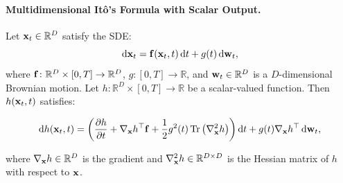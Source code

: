 \paragraph{Multidimensional It\^o's Formula with Scalar Output.}
Let ${\mathbf{x}}_t \in \mathbb{R}^D$ satisfy the SDE:
\[
\mathop{}\!\mathrm{d} {\mathbf{x}}_t = {\mathbf{f}}({\mathbf{x}}_t, t) \mathop{}\!\mathrm{d} t + g(t) \mathop{}\!\mathrm{d} {\mathbf{w}}_t,
\]
where ${\mathbf{f}} \colon \mathbb{R}^D \times [0, T] \to \mathbb{R}^D$, $g \colon [0, T] \to \mathbb{R}$, and ${\mathbf{w}}_t \in \mathbb{R}^D$ is a $D$-dimensional Brownian motion. Let $h \colon \mathbb{R}^D \times [0, T] \to \mathbb{R}$ be a scalar-valued function. Then $h({\mathbf{x}}_t, t)$ satisfies:
\begin{mdframed}
\begin{align}\label{eq:Ito-scalar}
    \mathop{}\!\mathrm{d} h({\mathbf{x}}_t, t)
= \left( \frac{\partial h}{\partial t}
+ \nabla_{{\mathbf{x}}} h^\top {\mathbf{f}}
+ \frac{1}{2} g^2(t) \operatorname{Tr} \left( \nabla^2_{{\mathbf{x}}} h \right) \right) \mathop{}\!\mathrm{d} t
+ g(t) \nabla_{{\mathbf{x}}} h^\top \mathop{}\!\mathrm{d} {\mathbf{w}}_t,
\end{align}
\end{mdframed}
where $\nabla_{{\mathbf{x}}} h \in \mathbb{R}^D$ is the gradient and $\nabla^2_{{\mathbf{x}}} h \in \mathbb{R}^{D \times D}$ is the Hessian matrix of $h$ with respect to ${\mathbf{x}}$.



